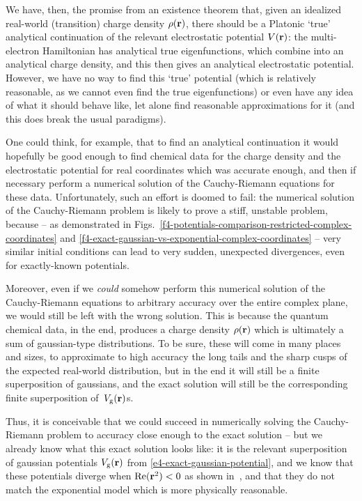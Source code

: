 We have, then, the promise from an existence theorem that, given an idealized real-world (transition) charge density $\rho(\vb{r})$, there should be a Platonic `true' analytical continuation of the relevant electrostatic potential $V(\vb{r})$: the multi-electron Hamiltonian has analytical true eigenfunctions, which combine into an analytical charge density, and this then gives an analytical electrostatic potential. However, we have no way to find this `true' potential (which is relatively reasonable, as we cannot even find the true eigenfunctions) or even have any idea of what it should behave like, let alone find reasonable approximations for it (and this does break the usual paradigms).

One could think, for example, that to find an analytical continuation it would hopefully be good enough to find chemical data for the charge density and the electrostatic potential for real coordinates which was accurate enough, and then if necessary perform a numerical solution of the Cauchy-Riemann equations for these data. Unfortunately, such an effort is doomed to fail: the numerical solution of the Cauchy-Riemann problem is likely to prove a stiff, unstable problem, because -- as demonstrated in Figs.~\ref{f4-potentials-comparison-restricted-complex-coordinates} and \ref{f4-exact-gaussian-vs-exponential-complex-coordinates} -- very similar initial conditions can lead to very sudden, unexpected divergences, even for exactly-known potentials.

Moreover, even if we \textit{could} somehow perform this numerical solution of the Cauchy-Riemann equations to arbitrary accuracy over the entire complex plane, we would still be left with the wrong solution. This is because the quantum chemical data, in the end, produces a charge density $\rho(\vb{r})$ which is ultimately a sum of gaussian-type distributions. To be sure, these will come in many places and sizes, to approximate to high accuracy the long tails and the sharp cusps of the expected real-world distribution, but in the end it will still be a finite superposition of gaussians, and the exact solution will still be the corresponding finite superposition of~$V_\mathrm{g}(\vb{r})$s. 

Thus, it is conceivable that we could succeed in numerically solving the Cauchy-Riemann problem to accuracy close enough to the exact solution -- but we already know what this exact solution looks like: it is the relevant superposition of gaussian potentials $V_\mathrm{g}(\vb{r})$ from \eqref{e4-exact-gaussian-potential}, and we know that these potentials diverge when $\Re(\vb{r}^2)<0$ as shown in~, and that they do not match the exponential model which is more physically reasonable.

